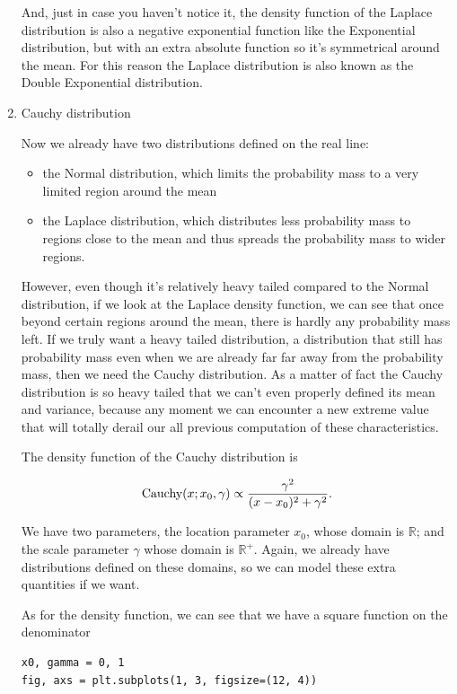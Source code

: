 \documentclass[11pt]{article}
\begin{document}
\begin{enumerate}
And, just in case you haven't notice it, the density function of the Laplace distribution is also a negative exponential function like the Exponential distribution, but with an extra absolute function so it's symmetrical around the mean. For this reason the Laplace distribution is also known as the Double Exponential distribution.

\item Cauchy distribution
\label{sec:orgf2acf09}

Now we already have two distributions defined on the real line:

\begin{itemize}
\item the Normal distribution, which limits the probability mass to a very
limited region around the mean
\item the Laplace distribution, which distributes less probability mass to
regions close to the mean and thus spreads the probability mass to
wider regions.
\end{itemize}

However, even though it's relatively heavy tailed compared to the Normal distribution, if we look at the Laplace density function, we can see that once beyond certain regions around the mean, there is hardly any probability mass left. If we truly want a heavy tailed distribution, a distribution that still has probability mass even when we are already far far away from the probability mass, then we need the Cauchy distribution. As a matter of fact the Cauchy distribution is so heavy tailed that we can't even properly defined its mean and variance, because any moment we can encounter a new extreme value that will totally derail our all previous computation of these characteristics.

The density function of the Cauchy distribution is

$$ \text{Cauchy} (x; x_0, \gamma) \propto { \gamma^2 \over (x - x_0)^2 + \gamma^2  }.$$

We have two parameters, the location parameter \(x_0\), whose domain is \(\mathbb{R}\); and the scale parameter \(\gamma\) whose domain is \(\mathbb{R}^+\). Again, we already have distributions defined on these domains, so we can model these extra quantities if we want.

As for the density function, we can see that we have a square function on the denominator

\begin{verbatim}
x0, gamma = 0, 1
fig, axs = plt.subplots(1, 3, figsize=(12, 4))


\end{verbatim}
\end{enumerate}
\end{document}
